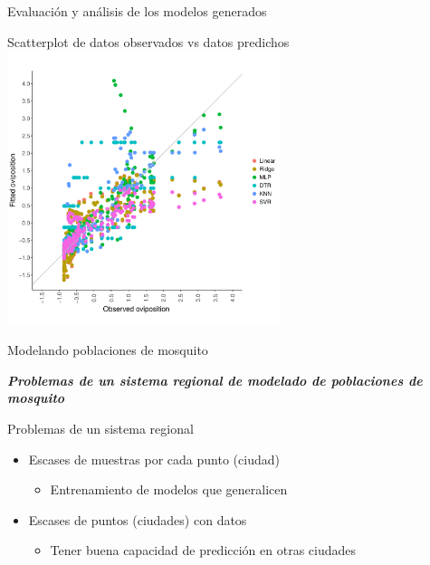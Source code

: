 \documentclass[10pt]{beamer}
\newcommand\IncrFont{\fontsize{20}{20}\selectfont}
\begin{document}
\begin{frame}{Evaluación y análisis de los modelos generados}
  \begin{center}
    Scatterplot de datos observados vs datos predichos
    \includegraphics[width=0.6\textwidth]{scatterplot}
  \end{center}
\end{frame}


\begin{frame}{Modelando poblaciones de mosquito}
  \IncrFont
  \begin{center}
    \textit{\textbf{Problemas de un sistema regional de modelado de poblaciones de mosquito}}
  \end{center}
\end{frame}





\begin{frame}{Problemas de un sistema regional}
  \begin{itemize}[<+->]
    \item Escases de muestras por cada punto (ciudad)
    \begin{itemize}
      \item Entrenamiento de modelos que generalicen
    \end{itemize}
    \item Escases de puntos (ciudades) con datos
    \begin{itemize}
      \item Tener buena capacidad de predicción en otras ciudades
    \end{itemize}

  \end{itemize}
\end{frame}
\end{document}

